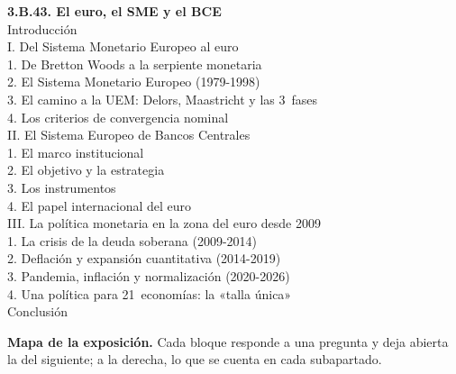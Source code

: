 \documentclass[11pt]{article}
\begin{document}
\begin{esquema}[unbreakable]
\textbf{3.B.43. El euro, el SME y el BCE}\\[2pt]
Introducción\\
I. Del Sistema Monetario Europeo al euro\\
\hspace*{1.5em}1. De Bretton Woods a la serpiente monetaria\\
\hspace*{1.5em}2. El Sistema Monetario Europeo (1979-1998)\\
\hspace*{1.5em}3. El camino a la UEM: Delors, Maastricht y las 3~fases\\
\hspace*{1.5em}4. Los criterios de convergencia nominal\\
II. El Sistema Europeo de Bancos Centrales\\
\hspace*{1.5em}1. El marco institucional\\
\hspace*{1.5em}2. El objetivo y la estrategia\\
\hspace*{1.5em}3. Los instrumentos\\
\hspace*{1.5em}4. El papel internacional del euro\\
III. La política monetaria en la zona del euro desde 2009\\
\hspace*{1.5em}1. La crisis de la deuda soberana (2009-2014)\\
\hspace*{1.5em}2. Deflación y expansión cuantitativa (2014-2019)\\
\hspace*{1.5em}3. Pandemia, inflación y normalización (2020-2026)\\
\hspace*{1.5em}4. Una política para 21~economías: la «talla única»\\
Conclusión
\end{esquema}

\begin{anotaciones}
\textbf{Mapa de la exposición.} Cada bloque responde a una pregunta y deja abierta la del siguiente; a la derecha, lo que se cuenta en cada subapartado.
\begin{infografiacaja}
\caption{Mapa del tema: la pregunta de cada bloque y el hilo que los une}\label{figu:mapa-tema}
\end{infografiacaja}
\end{anotaciones}
\end{document}
